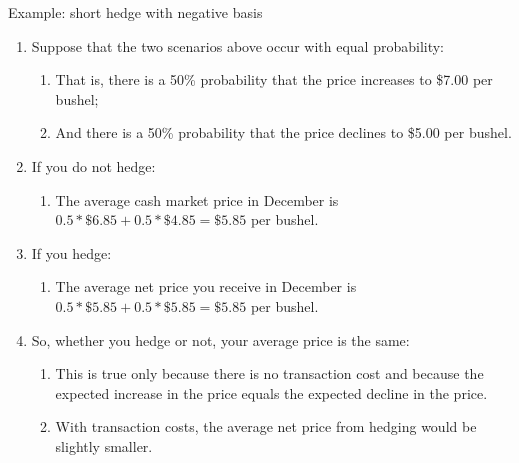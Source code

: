 \documentclass[table,xcolor=pdftex,dvipsnames]{beamer}\usepackage[]{graphicx}\usepackage[]{color}
\begin{document}
\begin{frame}[allowframebreaks]{Example: short hedge with negative basis}
\begin{enumerate}[label=\textbullet]
  \item Suppose that the two scenarios above occur with equal probability:
      \begin{enumerate}[label=\arabic*)]
            \item That is, there is a 50\% probability that the price increases to \$7.00 per bushel;
            \item And there is a 50\% probability that the price declines to \$5.00 per bushel.
      \end{enumerate}
  \item If you do not hedge:
      \begin{enumerate}[label=-]
            \item The average cash market price in December is $0.5*\$6.85+0.5*\$4.85 = \$5.85$ per bushel.
      \end{enumerate}
  \item If you hedge:
      \begin{enumerate}[label=-]
            \item The average net price you receive in December is $0.5*\$5.85+0.5*\$5.85 = \$5.85$ per bushel.
      \end{enumerate}
  \framebreak
  \item So, whether you hedge or not, your average price is the same:
      \begin{enumerate}[label=-]
            \item This is true only because there is no transaction cost and because the expected increase in the price equals the expected decline in the price.
            \item With transaction costs, the average net price from hedging would be slightly smaller.
      \end{enumerate}
\end{enumerate}
\end{frame}

\end{document}
